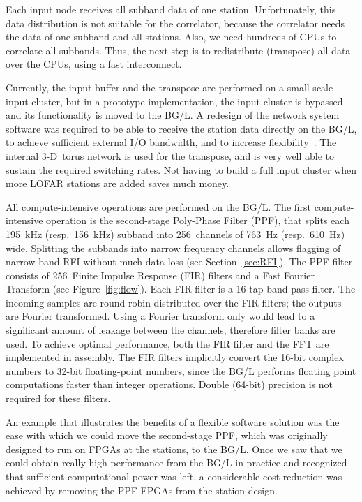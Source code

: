 \documentclass[journal]{IEEEtran}
\begin{document}
Each input node receives all subband data of one station.
Unfortunately, this data distribution is not suitable for the correlator,
because the correlator needs the data of one subband and all stations.
Also, we need hundreds of CPUs to correlate all subbands.
Thus, the next step is to redistribute (transpose) all data over the CPUs,
using a fast interconnect.

Currently, the input buffer and the transpose are performed on a small-scale
input cluster, but in a prototype implementation, the input cluster is
bypassed and its functionality is moved to the BG/L.
A redesign of the network system software was required to be able to
receive the station data directly on the BG/L, to achieve sufficient
external I/O bandwidth, and to increase flexibility~\cite{Iskra:08}.
The internal 3-D~torus network is used for the transpose, and is very well able
to sustain the required switching rates.
Not having to build a full input cluster when more LOFAR stations are added
saves much money.

All compute-intensive operations are performed on the BG/L.
The first compute-intensive operation is the second-stage Poly-Phase Filter
(PPF), that splits each 195~kHz (resp.\ 156~kHz) subband into 256~channels of
763~Hz (resp.\ 610~Hz) wide.
Splitting the subbands into narrow frequency channels allows flagging
of narrow-band RFI without much data loss (see Section~\ref{sec:RFI}).
The PPF filter consists of 256~Finite Impulse Response (FIR) filters and a
Fast Fourier Transform (see Figure~\ref{fig:flow}).
Each FIR filter is a 16-tap band pass filter.
The incoming samples are round-robin distributed over the FIR filters;
the outputs are Fourier transformed.
Using a Fourier transform only would lead to a significant amount of leakage
between the channels, therefore filter banks are used.
To achieve optimal performance, both the FIR filter and the FFT are implemented
in assembly.
The FIR filters implicitly convert the 16-bit complex numbers to 32-bit
floating-point numbers, since the BG/L performs floating point computations
faster than integer operations.
Double (64-bit) precision is not required for these filters.

An example that illustrates the benefits of a flexible software solution was
the ease with which we could move the second-stage PPF, which was
originally designed to run on FPGAs at the stations, to the BG/L.
Once we saw that we could obtain really high performance from the BG/L
in practice and recognized that sufficient computational power was left,
a considerable cost reduction was achieved by removing the PPF FPGAs from the
station design.
\end{document}
